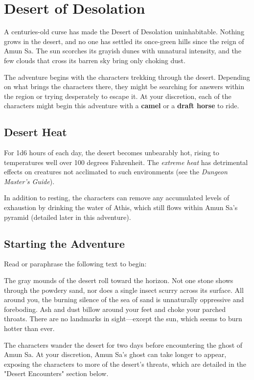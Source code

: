 \documentclass[10pt,a4paper,twoside,bg=print,twocolumn,openany,nodeprecatedcode]{dndbook}
\begin{document}
\section{Desert of Desolation}
A centuries-old curse has made the Desert of Desolation uninhabitable. Nothing grows in the desert, and no one has settled its once-green hills since the reign of Amun Sa. The sun scorches its grayish dunes with unnatural intensity, and the few clouds that cross its barren sky bring only choking dust.

The adventure begins with the characters trekking through the desert. Depending on what brings the characters there, they might be searching for answers within the region or trying desperately to escape it. At your discretion, each of the characters might begin this adventure with a \textbf{camel} or a \textbf{draft horse} to ride.

\subsection{Desert Heat}
For 1d6 hours of each day, the desert becomes unbearably hot, rising to temperatures well over 100 degrees Fahrenheit. The \textit{extreme heat} has detrimental effects on creatures not acclimated to such environments (see the \textit{Dungeon Master's Guide}).

In addition to resting, the characters can remove any accumulated levels of exhaustion by drinking the water of Athis, which still flows within Amun Sa's pyramid (detailed later in this adventure).

\subsection{Starting the Adventure}
Read or paraphrase the following text to begin:

\begin{DndReadAloud}{}
The gray mounds of the desert roll toward the horizon. Not one stone shows through the powdery sand, nor does a single insect scurry across its surface. All around you, the burning silence of the sea of sand is unnaturally oppressive and foreboding. Ash and dust billow around your feet and choke your parched throats. There are no landmarks in sight—except the sun, which seems to burn hotter than ever.

\end{DndReadAloud}

The characters wander the desert for two days before encountering the ghost of Amun Sa. At your discretion, Amun Sa's ghost can take longer to appear, exposing the characters to more of the desert's threats, which are detailed in the "Desert Encounters" section below.
\end{document}
